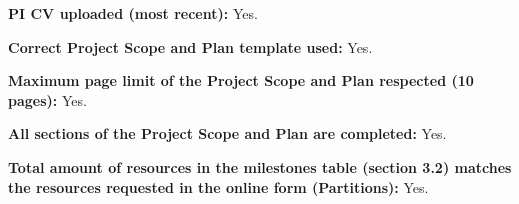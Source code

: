 \documentclass[11pt, a4paper]{article}
\begin{document}
\vspace{0.5em}
\noindent\textbf{PI CV uploaded (most recent):} Yes.

\vspace{0.5em}
\noindent\textbf{Correct Project Scope and Plan template used:} Yes.

\vspace{0.5em}
\noindent\textbf{Maximum page limit of the Project Scope and Plan respected (10 pages):} Yes.

\vspace{0.5em}
\noindent\textbf{All sections of the Project Scope and Plan are completed:} Yes.

\vspace{0.5em}
\noindent\textbf{Total amount of resources in the milestones table (section 3.2) matches the resources requested in the online form (Partitions):} Yes.
\end{document}
